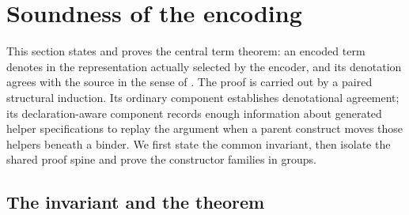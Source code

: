 \section{Soundness of the encoding}
\label{sec:beer-soundness}

This section states and proves the central term theorem: an encoded term denotes in the representation actually selected by the encoder, and its denotation agrees with the source in the sense of .
The proof is carried out by a paired structural induction.
Its ordinary component establishes denotational agreement; its declaration-aware component records enough information about generated helper specifications to replay the argument when a parent construct moves those helpers beneath a binder.
We first state the common invariant, then isolate the shared proof spine and prove the constructor families in groups.

\subsection{The invariant and the theorem}
\label{sec:beer-invariant}

